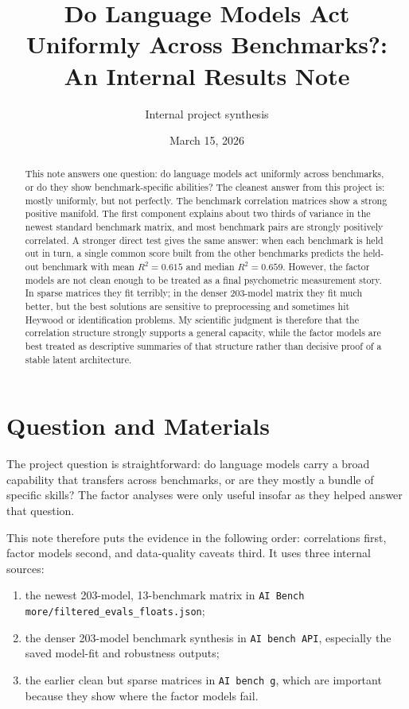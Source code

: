 \documentclass[11pt]{article}
\title{Do Language Models Act Uniformly Across Benchmarks?:\\An Internal Results Note}
\author{Internal project synthesis}
\date{March 15, 2026}
\begin{document}
\maketitle

\begin{abstract}
This note answers one question: do language models act uniformly across benchmarks, or do they show benchmark-specific abilities? The cleanest answer from this project is: mostly uniformly, but not perfectly. The benchmark correlation matrices show a strong positive manifold. The first component explains about two thirds of variance in the newest standard benchmark matrix, and most benchmark pairs are strongly positively correlated. A stronger direct test gives the same answer: when each benchmark is held out in turn, a single common score built from the other benchmarks predicts the held-out benchmark with mean $R^2 = 0.615$ and median $R^2 = 0.659$. However, the factor models are not clean enough to be treated as a final psychometric measurement story. In sparse matrices they fit terribly; in the denser 203-model matrix they fit much better, but the best solutions are sensitive to preprocessing and sometimes hit Heywood or identification problems. My scientific judgment is therefore that the correlation structure strongly supports a general capacity, while the factor models are best treated as descriptive summaries of that structure rather than decisive proof of a stable latent architecture.
\end{abstract}

\section{Question and Materials}
The project question is straightforward: do language models carry a broad capability that transfers across benchmarks, or are they mostly a bundle of specific skills? The factor analyses were only useful insofar as they helped answer that question.

This note therefore puts the evidence in the following order: correlations first, factor models second, and data-quality caveats third. It uses three internal sources:
\begin{enumerate}
\item the newest 203-model, 13-benchmark matrix in \texttt{AI Bench more/filtered\_evals\_floats.json};
\item the denser 203-model benchmark synthesis in \texttt{AI bench API}, especially the saved model-fit and robustness outputs;
\item the earlier clean but sparse matrices in \texttt{AI bench g}, which are important because they show where the factor models fail.
\end{enumerate}
\end{document}
